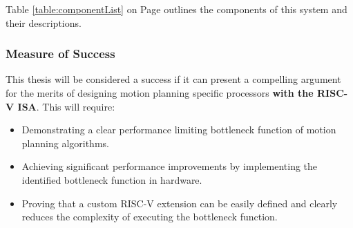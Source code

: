         Table \ref{table:componentList} on Page \pageref{table:componentList} outlines the components of this system and their descriptions.
        

    \subsubsection{Measure of Success}
        This thesis will be considered a success if it can present a compelling argument for the merits of designing motion planning specific processors \textbf{with the RISC-V ISA}. This will require:
        \begin{itemize}
        \item Demonstrating a clear performance limiting bottleneck function of motion planning algorithms.
        \item Achieving significant performance improvements by implementing the identified bottleneck function in hardware.
        \item Proving that a custom RISC-V extension can be easily defined and clearly reduces the complexity of executing the bottleneck function.
        \end{itemize}